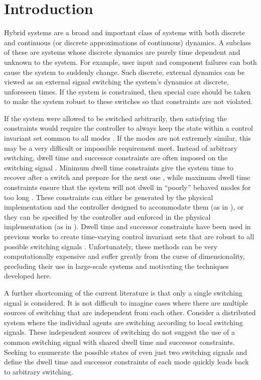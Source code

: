 \section{Introduction}
Hybrid systems are a broad and important class of systems with both discrete and continuous (or discrete approximations of continuous) dynamics. A subclass of these are systems whose discrete dynamics are purely time dependent and unknown to the system. For example, user input and component failures can both cause the system to suddenly change. Such discrete, external dynamics can be viewed as an external signal switching the system's dynamics at discrete, unforeseen times. If the system is constrained, then special care should be taken to make the system robust to these switches so that constraints are not violated. 

If the system were allowed to be switched arbitrarily, then satisfying the constraints would require the controller to always keep the state within a control invariant set common to all modes \cite{Liberzon1999}. If the modes are not extremely similar, this may be a very difficult or impossible requirement meet. Instead of arbitrary switching, dwell time and successor constraints are often imposed on the switching signal \cite{Liberzon1999,Morse1999}. Minimum dwell time constraints give the system time to recover after a switch and prepare for the next one \cite{Danielson2019}, while maximum dwell time constraints ensure that the system will not dwell in ``poorly'' behaved modes for too long \cite{Hall2022}. These constraints can either be generated by the physical implementation and the controller designed to accommodate them (as in \cite{Danielson2019}), or they can be specified by the controller and enforced in the physical implementation (as in \cite{Zhang2016}). Dwell time and successor constraints have been used in previous works to create time-varying control invariant sets that are robust to all possible switching signals \cite{Danielson2019}. Unfortunately, these methods can be very computationally expensive and suffer greatly from the curse of dimensionality, precluding their use in large-scale systems and motivating the techniques developed here.

A further shortcoming of the current literature is that only a single switching signal is considered. It is not difficult to imagine cases where there are multiple sources of switching that are independent from each other. Consider a distributed system where the individual agents are switching according to local switching signals. These independent sources of switching do not suggest the use of a common switching signal with shared dwell time and successor constraints. Seeking to enumerate the possible states of even just two switching signals and define the dwell time and successor constraints of each mode quickly leads back to arbitrary switching.

